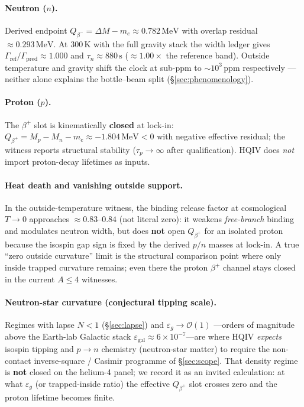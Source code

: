 \documentclass[11pt,notitlepage]{amsart}
\begin{document}
\paragraph{Neutron ($n$).}
Derived endpoint $Q_{\beta^-}=\Delta M-m_e\approx 0.782\,\mathrm{MeV}$ with overlap
residual $\approx 0.293\,\mathrm{MeV}$. At $300\,\mathrm{K}$ with the full gravity
stack the width ledger gives $\Gamma_{\mathrm{ref}}/\Gamma_{\mathrm{pred}}\approx 1.000$
and $\tau_n\approx 880\,\mathrm{s}$ ($\approx 1.00\times$ the reference band). Outside
temperature and gravity shift the clock at sub-ppm to $\sim 10^3\,\mathrm{ppm}$ respectively
---neither alone explains the bottle--beam split (\S\ref{sec:phenomenology}).

\paragraph{Proton ($p$).}
The $\beta^+$ slot is kinematically \textbf{closed} at lock-in:
$Q_{\beta^+}=M_p-M_n-m_e\approx -1.804\,\mathrm{MeV}<0$ with negative effective
residual; the witness reports structural stability ($\tau_p\to\infty$ after
qualification). HQIV does \emph{not} import proton-decay lifetimes as inputs.

\paragraph{Heat death and vanishing outside support.}
In the outside-temperature witness, the binding release factor at cosmological
$T\to 0$ approaches $\approx 0.83$--$0.84$ (not literal zero): it weakens
\emph{free-branch} binding and modulates neutron width, but does \textbf{not} open
$Q_{\beta^+}$ for an isolated proton because the isospin gap sign is fixed by the
derived $p/n$ masses at lock-in. A true ``zero outside curvature'' limit is the
structural comparison point where only inside trapped curvature remains; even there
the proton $\beta^+$ channel stays closed in the current $A\le 4$ witnesses.

\paragraph{Neutron-star curvature (conjectural tipping scale).}
Regimes with lapse $N<1$ (\S\ref{sec:lapse}) and $\varepsilon_g\to\mathcal{O}(1)$
---orders of magnitude above the Earth-lab Galactic stack
$\varepsilon_{\mathrm{gal}}\approx 6\times 10^{-7}$---are where HQIV \emph{expects}
isospin tipping and $p\to n$ chemistry (neutron-star matter) to require the
non-contact inverse-square / Casimir programme of \S\ref{sec:scope}. That density
regime is \textbf{not} closed on the helium-4 panel; we record it as an invited
calculation: at what $\varepsilon_g$ (or trapped-inside ratio) the effective
$Q_{\beta^+}$ slot crosses zero and the proton lifetime becomes finite.
\end{document}
